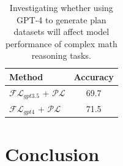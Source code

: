 \documentclass[11pt]{article}
\begin{document}
\begin{table}[h]
\centering
\small
{%
\begin{tabular}{lc}
\hline
\textbf{Method} & \textbf{Accuracy} \\
\hline
$\mathcal{FL}_{gpt3.5}$ + $\mathcal{PL}$ & 69.7 \\
$\mathcal{FL}_{gpt4}$ + $\mathcal{PL}$ & 71.5 \\
\hline
\end{tabular}
}
\caption{Investigating whether using GPT-4 to generate plan datasets will affect model performance of complex math reasoning tasks.}
\label{tab:gptvs}
\end{table}




\section{Conclusion}


\end{document}
